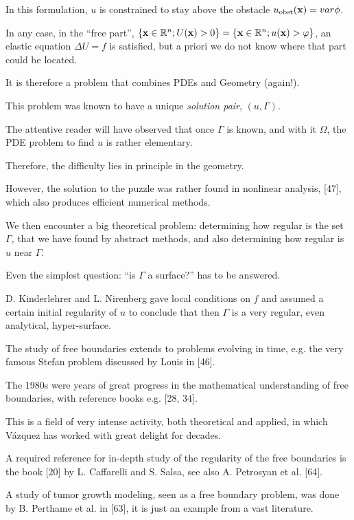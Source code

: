 \documentclass{article}
\begin{document}
In this formulation, $u$ is constrained to stay above the obstacle $u_{\rm obst}({\bf x}) = var\phi$.

%
In any case, in the ``free part'', $\{{\bf x}\in\mathbb{R}^n;U({\bf x}) > 0\} = \{{\bf x}\in\mathbb{R}^n;u({\bf x}) > \varphi\}$, an elastic equation $\Delta U = f$ is satisfied, but a priori we do not know where that part could be located.

It is therefore a problem that combines PDEs and Geometry (again!).

%
This problem was known to have a unique \textit{solution pair}, $(u,\Gamma)$.

The attentive reader will have observed that once $\Gamma$ is known, and with it $\Omega$, the PDE problem to find $u$ is rather elementary.

Therefore, the difficulty lies in principle in the geometry.

However, the solution to the puzzle was rather found in nonlinear analysis, [47], which also produces efficient numerical methods.

%
We then encounter a big theoretical problem: determining how regular is the set $\Gamma$, that we have found by abstract methods, and also determining how regular is $u$ near $\Gamma$.

Even the simplest question: ``is $\Gamma$ a surface?'' has to be answered.

D. Kinderlehrer and L. Nirenberg gave local conditions on $f$ and assumed a certain initial regularity of $u$ to conclude that then $\Gamma$ is a very regular, even analytical, hyper-surface.

The study of free boundaries extends to problems evolving in time, e.g. the very famous Stefan problem discussed by Louis in [46].

The 1980s were years of great progress in the mathematical understanding of free boundaries, with reference books e.g. [28, 34].

%
This is a field of very intense activity, both theoretical and applied, in which V\'azquez has worked with great delight for decades.

A required reference for in-depth study of the regularity of the free boundaries is the book [20] by L. Caffarelli and S. Salsa, see also A. Petrosyan et al. [64].

A study of tumor growth modeling, seen as a free boundary problem, was done by B. Perthame et al. in [63], it is just an example from a vast literature.
\end{document}
